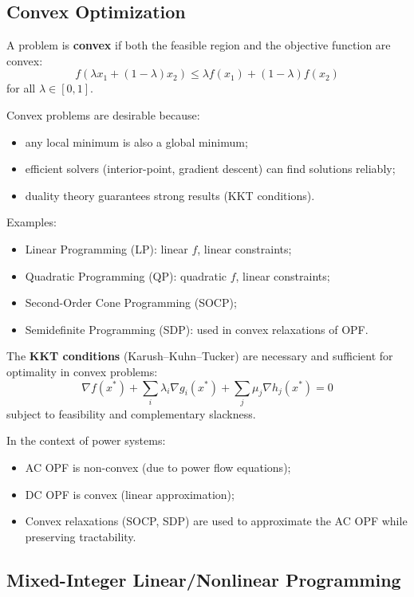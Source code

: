 \documentclass[11pt]{article}
\begin{document}
	\subsection{Convex Optimization}
	
	A problem is \textbf{convex} if both the feasible region and the objective function are convex:
	\[
	f(\lambda x_1 + (1-\lambda)x_2) \le \lambda f(x_1) + (1-\lambda)f(x_2)
	\]
	for all $\lambda \in [0,1]$.
	
	Convex problems are desirable because:
	\begin{itemize}
		\item any local minimum is also a global minimum;
		\item efficient solvers (interior-point, gradient descent) can find solutions reliably;
		\item duality theory guarantees strong results (KKT conditions).
	\end{itemize}
	
	Examples:
	\begin{itemize}
		\item Linear Programming (LP): linear $f$, linear constraints;
		\item Quadratic Programming (QP): quadratic $f$, linear constraints;
		\item Second-Order Cone Programming (SOCP);
		\item Semidefinite Programming (SDP): used in convex relaxations of OPF.
	\end{itemize}
	
	The \textbf{KKT conditions} (Karush–Kuhn–Tucker) are necessary and sufficient for optimality in convex problems:
	\[
	\nabla f(x^*) + \sum_i \lambda_i \nabla g_i(x^*) + \sum_j \mu_j \nabla h_j(x^*) = 0
	\]
	subject to feasibility and complementary slackness.
	
	In the context of power systems:
	\begin{itemize}
		\item AC OPF is non-convex (due to power flow equations);
		\item DC OPF is convex (linear approximation);
		\item Convex relaxations (SOCP, SDP) are used to approximate the AC OPF while preserving tractability.
	\end{itemize}
	
	\subsection{Mixed-Integer Linear/Nonlinear Programming}
	
\end{document}
